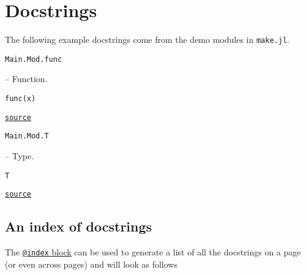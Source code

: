 \chapter{Docstrings}



\label{4859465668994674752}{}


The following example docstrings come from the demo modules in \texttt{make.jl}.


\hypertarget{5669384191785722396}{\texttt{Main.Mod.func}}  -- {Function.}

\begin{adjustwidth}{2em}{0pt}


\begin{verbatim}
func(x)
\end{verbatim}




\href{https://example.org/Repository.jl/blob/test/examples/make.jl#L27-31}{\texttt{source}}


\end{adjustwidth}
\hypertarget{1885743281855441478}{\texttt{Main.Mod.T}}  -- {Type.}

\begin{adjustwidth}{2em}{0pt}


\begin{verbatim}
T
\end{verbatim}




\href{https://example.org/Repository.jl/blob/test/examples/make.jl#L34-38}{\texttt{source}}


\end{adjustwidth}

\section{An index of docstrings}



\label{4901604269105032859}{}


The \href{@ref}{\texttt{@index} block} can be used to generate a list of all the docstrings on a page (or even across pages) and will look as follows


